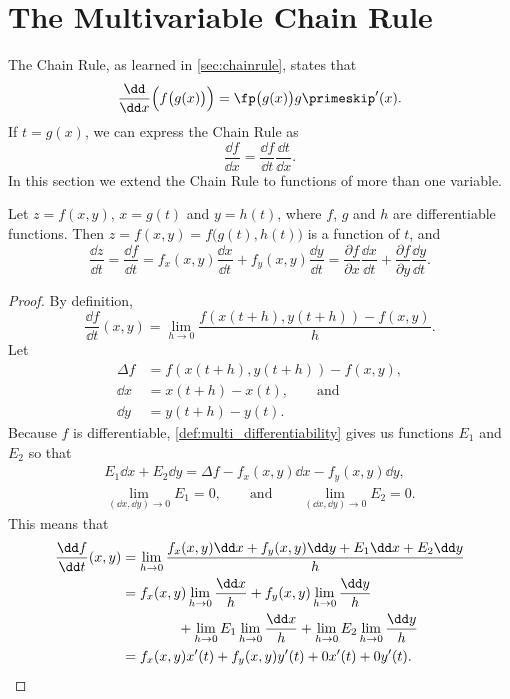 \section{The Multivariable Chain Rule}\label{sec:multi_chain}

The Chain Rule, as learned in \autoref{sec:chainrule}, states that
\[\dfrac{\dd}{\dd x}\Bigl(f\bigl(g(x)\bigr)\Bigr) = \fp\bigl(g(x)\bigr)g\primeskip'(x).\]
If $t=g(x)$, we can express the Chain Rule as 
\[\frac{\dd f}{\dd x} = \frac{\dd f}{\dd t}\frac{\dd t}{\dd x}.\]
In this section we extend the Chain Rule to functions of more than one variable.

\begin{theorem}\label{thm:multi_chain}%
Let $z=f(x,y)$, $x=g(t)$ and $y=h(t)$, where $f$, $g$ and $h$ are differentiable functions. Then $z = f(x,y) = f\bigl(g(t),h(t)\bigr)$ is a function of $t$, and 
\[
	\frac{\dd z}{\dd t} = \frac{\dd f}{\dd t}
	= f_x(x,y)\frac{\dd x}{\dd t}+f_y(x,y)\frac{\dd y}{\dd t}
	= \frac{\partial f}{\partial x}\frac{\dd x}{\dd t}
	+\frac{\partial f}{\partial y}\frac{\dd y}{\dd t}.
\]
\end{theorem}

\begin{proof}
By definition,
\[\frac{\dd f}{\dd t}(x,y)=\lim_{h\to0}\frac{f(x(t+h),y(t+h))-f(x,y)}h.\]
Let
\begin{align*}
 \Delta f&=f(x(t+h),y(t+h))-f(x,y), \\
 \dd x&=x(t+h)-x(t),\qquad\text{and} \\
 \dd y&=y(t+h)-y(t).
\end{align*}
Because $f$ is differentiable, \autoref{def:multi_differentiability} gives us functions $E_1$ and $E_2$ so that
\begin{gather*}
 E_1\dd x+E_2\dd y = \Delta f-f_x(x,y)\dd x-f_y(x,y)\dd y,\\
 \lim_{(\dd x,\dd y)\to0}E_1=0,\qquad\text{and}\qquad
 \lim_{(\dd x,\dd y)\to0}E_2=0.
\end{gather*}
This means that
\begin{align*}
 \frac{\dd f}{\dd t}(x,y)
 &=\lim_{h\to0}\frac{f_x(x,y)\dd x+f_y(x,y)\dd y+E_1\dd x+E_2\dd y}h \\
 &=f_x(x,y)\lim_{h\to0}\frac{\dd x}h+f_y(x,y)\lim_{h\to0}\frac{\dd y}h \\
 &\qquad\qquad{}
 +\lim_{h\to0}E_1\lim_{h\to0}\frac{\dd x}h+\lim_{h\to0}E_2\lim_{h\to0}\frac{\dd y}h \\
 &=f_x(x,y)x'(t)+f_y(x,y)y'(t)+0x'(t)+0y'(t).\qedhere
\end{align*}
\end{proof}

